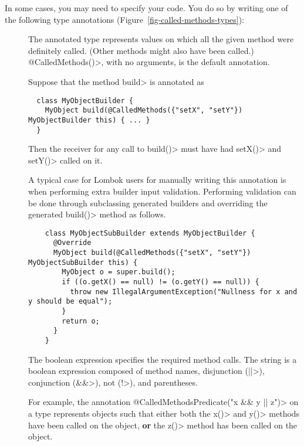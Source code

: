 In some cases, you may need to specify your code. You do so by writing one of the following type
annotations (Figure~\ref{fig-called-methods-types}):
\begin{description}
\item[]
  The annotated type represents values on which all the given method were definitely called.
  (Other methods might also have been called.) \<@CalledMethods()>, with no
  arguments, is the default annotation.

  Suppose that the method \<build> is annotated as

  \begin{Verbatim}
  class MyObjectBuilder {
    MyObject build(@CalledMethods({"setX", "setY"}) MyObjectBuilder this) { ... }
  }
  \end{Verbatim}

  Then the receiver for any call to \<build()> must have had \<setX()> and \<setY()> called on it.

  A typical case for Lombok users for manually writing this annotation is when performing extra
  builder input validation. Performing validation can be done through subclassing generated builders
  and overriding the generated \<build()> method as follows.

  \begin{Verbatim}
    class MyObjectSubBuilder extends MyObjectBuilder {
      @Override
      MyObject build(@CalledMethods({"setX", "setY"}) MyObjectSubBuilder this) {
        MyObject o = super.build();
        if ((o.getX() == null) != (o.getY() == null)) {
          throw new IllegalArgumentException("Nullness for x and y should be equal");
        }
        return o;
      }
    }
  \end{Verbatim}

\item[]
  The boolean expression specifies the required method calls.  The string
  is a boolean expression composed of method names, disjunction (\<||>),
  conjunction (\<\&\&>), not (\<!>), and parentheses.

  For example, the annotation \<@CalledMethodsPredicate("x \&\& y || z")> on a type represents
  objects such that either both the  \<x()> and \<y()> methods have been called on the object, \textbf{or}
  the \<z()> method has been called on the object.


\end{description}
